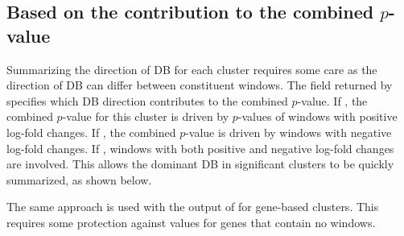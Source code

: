 \documentclass{report}\usepackage[]{graphicx}\usepackage[usenames,dvipsnames]{color}
\newcommand{\hlnum}[1]{\textcolor[rgb]{0.816,0.125,0.439}{#1}}%
\newcommand{\hlopt}[1]{\textcolor[rgb]{0,0,0}{#1}}%
\newcommand{\hlstd}[1]{\textcolor[rgb]{0.251,0.251,0.251}{#1}}%
\newcommand{\hlkwb}[1]{\textcolor[rgb]{0,0,0}{#1}}%
\newcommand{\hlkwd}[1]{\textcolor[rgb]{0.878,0.439,0.125}{#1}}%
\newenvironment{knitrout}{}{} %
\begin{document}
\subsection{Based on the contribution to the combined $p$-value}
Summarizing the direction of DB for each cluster requires some care as the direction of DB can differ between constituent windows.
The  field returned by  specifies which DB direction contributes to the combined $p$-value.
If , the combined $p$-value for this cluster is driven by $p$-values of windows with positive log-fold changes.
If , the combined $p$-value is driven by windows with negative log-fold changes.
If , windows with both positive and negative log-fold changes are involved.
This allows the dominant DB in significant clusters to be quickly summarized, as shown below.

\begin{knitrout}
\color{fgcolor}
\end{knitrout}

The same approach is used with the output of  for gene-based clusters.
This requires some protection against  values for genes that contain no windows.

\begin{knitrout}
\color{fgcolor}
\end{knitrout}
\end{document}
